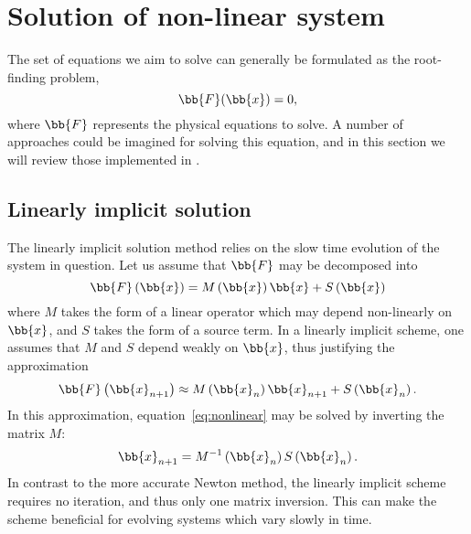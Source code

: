 \documentclass{notes}
\begin{document}
    \section{Solution of non-linear system}
    The set of equations we aim to solve can generally be formulated as the
    root-finding problem,
    \begin{equation}\label{eq:nonlinear}
        \bb{F}(\bb{x}) = 0,
    \end{equation}
    where $\bb{F}$ represents the physical equations to solve. A number of
    approaches could be imagined for solving this equation, and in this section
    we will review those implemented in \DREAM.

    \subsection{Linearly implicit solution}
    The linearly implicit solution method relies on the slow time evolution of
    the system in question. Let us assume that $\bb{F}$ may be decomposed into
    \begin{equation}
        \bb{F}\left( \bb{x} \right) = M\left( \bb{x} \right) \bb{x} + S\left( \bb{x} \right)
    \end{equation}
    where $M$ takes the form of a linear operator which may depend non-linearly
    on $\bb{x}$, and $S$ takes the form of a source term. In a linearly implicit
    scheme, one assumes that $M$ and $S$ depend weakly on $\bb{x}$, thus
    justifying the approximation
    \begin{equation}
        \bb{F}\left( \bb{x}_{n+1} \right)\approx M\left( \bb{x}_n\right) \bb{x}_{n+1}
        + S\left( \bb{x}_n \right).
    \end{equation}
    In this approximation, equation~\eqref{eq:nonlinear} may be solved by
    inverting the matrix $M$:
    \begin{equation}
        \bb{x}_{n+1} = M^{-1}\left(\bb{x}_n\right) S\left(\bb{x}_n\right).
    \end{equation}
    In contrast to the more accurate Newton method, the linearly implicit scheme
    requires no iteration, and thus only one matrix inversion. This can make the
    scheme beneficial for evolving systems which vary slowly in time.
    
\end{document}
